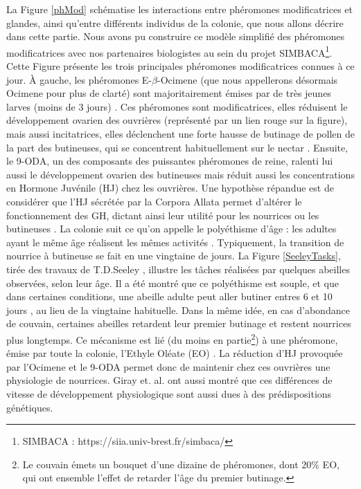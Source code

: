 			La Figure \ref{phMod} schématise les interactions entre phéromones modificatrices et glandes, ainsi qu'entre différents individus de la colonie, que nous allons décrire dans cette partie. Nous avons pu construire ce modèle simplifié des phéromones modificatrices avec nos partenaires biologistes au sein du projet SIMBACA\footnote{SIMBACA : https://siia.univ-brest.fr/simbaca/}. Cette Figure présente les trois principales phéromones modificatrices connues à ce jour. À gauche, les phéromones E-$\beta$-Ocimene (que nous appellerons désormais Ocimene pour plus de clarté) sont majoritairement émises par de très jeunes larves (moins de 3 jours) \cite{maisonnasse_e-b-ocimene_2010}. Ces phéromones sont modificatrices, elles réduisent le développement ovarien des ouvrières (représenté par un lien rouge sur la figure), mais aussi incitatrices, elles déclenchent une forte hausse de butinage de pollen de la part des butineuses, qui se concentrent habituellement sur le nectar \cite{maisonnasse_e-b-ocimene_2010}. Ensuite, le 9-ODA, un des composants des puissantes phéromones de reine, ralenti lui aussi le développement ovarien des butineuses mais réduit aussi les concentrations en Hormone Juvénile (HJ) chez les ouvrières. Une hypothèse répandue est de considérer que l'HJ sécrétée par la Corpora Allata permet d'altérer le fonctionnement des GH, dictant ainsi leur utilité pour les nourrices ou les butineuses \cite{robinson_colony_1998}.
			 La colonie suit ce qu'on appelle le polyéthisme d'âge : les adultes ayant le même âge réalisent les mêmes activités \cite{seeley_age_1991}. Typiquement, la transition de nourrice à butineuse se fait en une vingtaine de jours. La Figure \ref{SeeleyTasks}, tirée des travaux de T.D.Seeley \cite{seeley_wisdom_1995}, illustre les tâches réalisées par quelques abeilles observées, selon leur âge. Il a été montré que ce polyéthisme est souple, et que dans certaines conditions, une abeille adulte peut aller butiner entres 6 et 10 jours \cite{giray_effects_1994}, au lieu de la vingtaine habituelle. Dans la même idée, en cas d'abondance de couvain, certaines abeilles retardent leur premier butinage et restent nourrices plus longtemps. Ce mécanisme est lié (du moins en partie\footnote{Le couvain émets un bouquet d'une dizaine de phéromones, dont 20\% EO, qui ont ensemble l'effet de retarder l'âge du premier butinage.}) à une phéromone, émise par toute la colonie, l'Ethyle Oléate (EO) \cite{le_conte_primer_2001}. La réduction d'HJ provoquée par l'Ocimene et le 9-ODA permet donc de maintenir chez ces ouvrières une physiologie de nourrices. Giray et. al. \cite{giray_effects_1994} ont aussi montré que ces différences de vitesse de développement physiologique sont aussi dues à des prédispositions génétiques.
			

